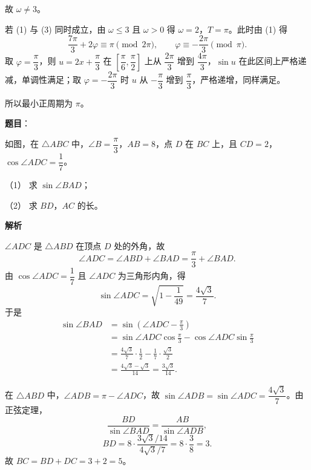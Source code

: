 \begin{answer}
故 $\omega\neq3$。

若 (1) 与 (3) 同时成立，由 $\omega\leqslant3$ 且 $\omega>0$ 得 $\omega=2$，$T=\pi$。此时由 (1) 得
\nopagebreak[4]
\[\frac{7\pi}3+2\varphi\equiv\pi\pmod{2\pi},\qquad \varphi\equiv-\frac{2\pi}3\pmod\pi .\]
取 $\varphi=\dfrac\pi3$，则 $u=2x+\dfrac\pi3$ 在 $\left[\dfrac\pi6,\dfrac\pi2\right]$ 上从 $\dfrac{2\pi}3$ 增到 $\dfrac{4\pi}3$，$\sin u$ 在此区间上严格递减，单调性满足；取 $\varphi=-\dfrac{2\pi}3$ 时 $u$ 从 $-\dfrac\pi3$ 增到 $\dfrac\pi3$，严格递增，同样满足。

所以最小正周期为 $\pi$。


\end{answer}
\begin{answer}

\textbf{题目}：

如图，在 $\triangle ABC$ 中，$\angle B=\dfrac\pi3$，$AB=8$，点 $D$ 在 $BC$ 上，且 $CD=2$，$\cos\angle ADC=\dfrac17$。
\nopagebreak[4]
\begin{center}\end{center}
\nopagebreak[4]
（1） 求 $\sin\angle BAD$；

（2） 求 $BD$，$AC$ 的长。

\textbf{解析}


$\angle ADC$ 是 $\triangle ABD$ 在顶点 $D$ 处的外角，故
\nopagebreak[4]
\[\angle ADC=\angle ABD+\angle BAD=\frac\pi3+\angle BAD .\]
由 $\cos\angle ADC=\dfrac17$ 且 $\angle ADC$ 为三角形内角，得
\nopagebreak[4]
\[\sin\angle ADC=\sqrt{1-\frac1{49}}=\frac{4\sqrt3}7 .\]
于是
\nopagebreak[4]
\[\begin{aligned}
\sin\angle BAD&=\sin\left(\angle ADC-\frac\pi3\right)\\
&=\sin\angle ADC\cos\frac\pi3-\cos\angle ADC\sin\frac\pi3\\
&=\frac{4\sqrt3}7\cdot\frac12-\frac17\cdot\frac{\sqrt3}2\\
&=\frac{4\sqrt3-\sqrt3}{14}=\frac{3\sqrt3}{14}.
\end{aligned}\]


在 $\triangle ABD$ 中，$\angle ADB=\pi-\angle ADC$，故 $\sin\angle ADB=\sin\angle ADC=\dfrac{4\sqrt3}7$。由正弦定理，
\nopagebreak[4]
\[\frac{BD}{\sin\angle BAD}=\frac{AB}{\sin\angle ADB},\]
\nopagebreak[4]
\[BD=8\cdot\frac{3\sqrt3/14}{4\sqrt3/7}=8\cdot\frac{3}{8}=3 .\]
故 $BC=BD+DC=3+2=5$。


\end{answer}
